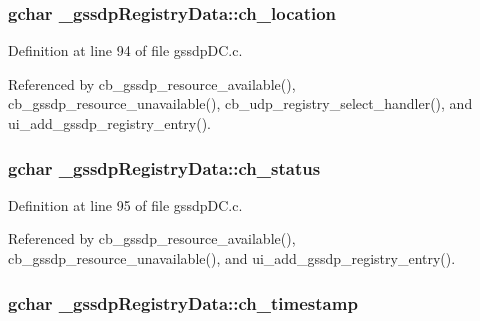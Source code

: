 \subsubsection[{\texorpdfstring{ch\+\_\+location}{ch_location}}]{\setlength{\rightskip}{0pt plus 5cm}gchar \+\_\+gssdp\+Registry\+Data\+::ch\+\_\+location}\hypertarget{struct__gssdp_registry_data_ac1ca256d22c387e9ef968fb8413d7796}{}\label{struct__gssdp_registry_data_ac1ca256d22c387e9ef968fb8413d7796}


Definition at line 94 of file gssdp\+D\+C.\+c.



Referenced by cb\+\_\+gssdp\+\_\+resource\+\_\+available(), cb\+\_\+gssdp\+\_\+resource\+\_\+unavailable(), cb\+\_\+udp\+\_\+registry\+\_\+select\+\_\+handler(), and ui\+\_\+add\+\_\+gssdp\+\_\+registry\+\_\+entry().

\subsubsection[{\texorpdfstring{ch\+\_\+status}{ch_status}}]{\setlength{\rightskip}{0pt plus 5cm}gchar \+\_\+gssdp\+Registry\+Data\+::ch\+\_\+status}\hypertarget{struct__gssdp_registry_data_a92d851353d8779ad1c5dd4e540a956e5}{}\label{struct__gssdp_registry_data_a92d851353d8779ad1c5dd4e540a956e5}


Definition at line 95 of file gssdp\+D\+C.\+c.



Referenced by cb\+\_\+gssdp\+\_\+resource\+\_\+available(), cb\+\_\+gssdp\+\_\+resource\+\_\+unavailable(), and ui\+\_\+add\+\_\+gssdp\+\_\+registry\+\_\+entry().

\subsubsection[{\texorpdfstring{ch\+\_\+timestamp}{ch_timestamp}}]{\setlength{\rightskip}{0pt plus 5cm}gchar \+\_\+gssdp\+Registry\+Data\+::ch\+\_\+timestamp}\hypertarget{struct__gssdp_registry_data_a97c1fccf55465d4de2168be0d70e2707}{}\label{struct__gssdp_registry_data_a97c1fccf55465d4de2168be0d70e2707}


